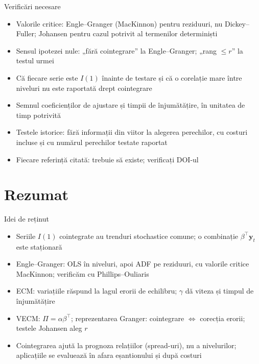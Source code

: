 \begin{frame}{Verificări necesare}
\itemsize{\small}
\begin{itemize}
    \item Valorile critice: Engle--Granger (MacKinnon) pentru reziduuri, nu Dickey--Fuller; Johansen pentru cazul potrivit al termenilor determiniști
    \item Sensul ipotezei nule: „fără cointegrare” la Engle--Granger; „rang $\le r$” la testul urmei
    \item Că fiecare serie este $I(1)$ înainte de testare și că o corelație mare între niveluri nu este raportată drept cointegrare
    \item Semnul coeficienților de ajustare și timpii de înjumătățire, în unitatea de timp potrivită
    \item Testele istorice: fără informații din viitor la alegerea perechilor, cu costuri incluse și cu numărul perechilor testate raportat
    \item Fiecare referință citată: trebuie să existe; verificați DOI-ul
\end{itemize}
\end{frame}


\section{Rezumat}

\begin{frame}{Idei de reținut}
\itemsize{\small}
\begin{itemize}
    \item Seriile $I(1)$ cointegrate au trenduri stochastice comune; o combinație $\beta^\top\mathbf y_t$ este staționară
    \item Engle--Granger: OLS în niveluri, apoi ADF pe reziduuri, cu valorile critice MacKinnon; verificăm cu Phillips--Ouliaris
    \item ECM: variațiile răspund la lagul erorii de echilibru; $\gamma$ dă viteza și timpul de înjumătățire
    \item VECM: $\Pi = \alpha\beta^\top$; reprezentarea Granger: cointegrare $\Leftrightarrow$ corecția erorii; testele Johansen aleg $r$
    \item Cointegrarea ajută la prognoza relațiilor (spread-uri), nu a nivelurilor; aplicațiile se evaluează în afara eșantionului și după costuri
\end{itemize}
\end{frame}

